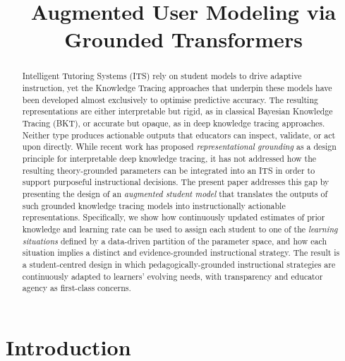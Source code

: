 \documentclass[runningheads]{llncs}
\begin{document}
%
\title{Augmented User Modeling via Grounded Transformers}
%
%
\authorrunning{}
%
\institute{}
%
\maketitle
%
\begin{abstract}

Intelligent Tutoring Systems (ITS) rely on student models to drive adaptive instruction, yet the Knowledge Tracing approaches that underpin these models have been developed almost exclusively to optimise predictive accuracy. The resulting representations are either interpretable but rigid, as in classical Bayesian Knowledge Tracing (BKT), or accurate but opaque, as in deep knowledge tracing approaches. Neither type produces actionable outputs that educators can inspect, validate, or act upon directly. While recent work has proposed \textit{representational grounding} as a design principle for interpretable deep knowledge tracing, it has not addressed how the resulting theory-grounded parameters can be integrated into an ITS in order to support purposeful instructional decisions. The present paper addresses this gap by presenting the design of an \textit{augmented student model} that translates the outputs of such grounded knowledge tracing models into instructionally actionable representations. Specifically, we show how continuously updated estimates of prior knowledge and learning rate can be used to assign each student to one of the \textit{learning situations} defined by a data-driven partition of the parameter space, and how each situation implies a distinct and evidence-grounded instructional strategy. The result is a student-centred design in which pedagogically-grounded instructional strategies are continuously adapted to learners’ evolving needs, with transparency and educator agency as first-class concerns.

\end{abstract}
%
%
\section{Introduction}
\end{document}
